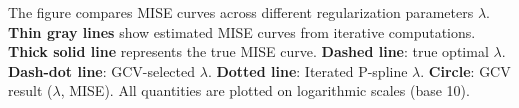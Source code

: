 The figure compares MISE curves across different regularization parameters $\lambda$. \textbf{Thin gray lines} show estimated MISE curves from iterative computations. \textbf{Thick solid line} represents the true MISE curve. \textbf{Dashed line}: true optimal $\lambda$. \textbf{Dash-dot line}: GCV-selected $\lambda$. \textbf{Dotted line}: Iterated P-spline $\lambda$. \textbf{Circle}: GCV result ($\lambda$, MISE). All quantities are plotted on logarithmic scales (base 10).
